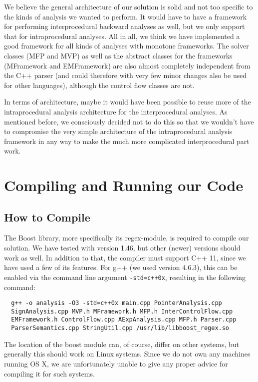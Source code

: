 \documentclass[a4paper,11pt]{article}
\begin{document}
We believe the general architecture of our solution is solid and not too specific to the kinds of analysis we wanted to perform. It would have to have a framework for performing interprocedural backward analyses as well, but we only support that for intraprocedural analyses. All in all, we think we have implemented a good framework for all kinds of analyses with monotone frameworks. The solver classes (MFP and MVP) as well as the abstract classes for the frameworks (MFramework and EMFramework) are also almost completely independent from the C++ parser (and could therefore with very few minor changes also be used for other languages), although the control flow classes are not.

In terms of architecture, maybe it would have been possible to reuse more of the intraprocedural analysis architecture for the interprocedural analyses. As mentioned before, we consciously decided not to do this so that we wouldn't have to compromise the very simple architecture of the intraprocedural analysis framework in any way to make the much more complicated interprocedural part work.

\section{Compiling and Running our Code}
\subsection{How to Compile}
The Boost library, more specifically its regex-module, is required to compile our solution. We have tested with version 1.46, but other (newer) versions should work as well. In addition to that, the compiler must support C++ 11, since we have used a few of its features. For g++ (we used version 4.6.3), this can be enabled via the command line argument \texttt{-std=c++0x}, resulting in the following command:
\begin{lstlisting}
  g++ -o analysis -O3 -std=c++0x main.cpp PointerAnalysis.cpp 
  SignAnalysis.cpp MVP.h MFramework.h MFP.h InterControlFlow.cpp 
  EMFramework.h ControlFlow.cpp AExpAnalysis.cpp MFP.h Parser.cpp 
  ParserSemantics.cpp StringUtil.cpp /usr/lib/libboost_regex.so
\end{lstlisting}
The location of the boost module can, of course, differ on other systems, but generally this should work on Linux systems. Since we do not own any machines running OS X, we are unfortunately unable to give any proper advice for compiling it for such systems.
\end{document}
